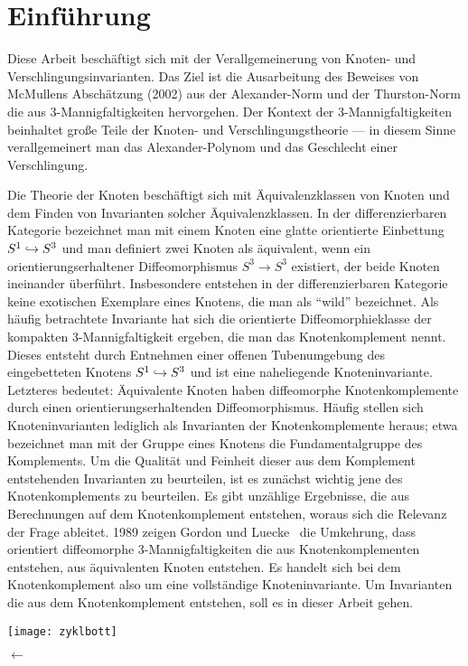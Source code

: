 \section{Einführung}
		
	\begin{minipage}[t][\textheight][t]{0.76\textwidth}

	Diese Arbeit beschäftigt sich mit der Verallgemeinerung von Knoten- und Verschlingungsinvarianten. Das Ziel ist die Ausarbeitung des Beweises von McMullens Abschätzung (2002) aus \cite{MCMULLEN.2002} der Alexander-Norm und der Thurston-Norm die aus 3-Mannigfaltigkeiten hervorgehen. Der Kontext der 3-Mannigfaltigkeiten beinhaltet große Teile der Knoten- und Verschlingungstheorie  --- in diesem Sinne verallgemeinert man das Alexander-Polynom und das Geschlecht einer Verschlingung.

	Die Theorie der Knoten beschäftigt sich mit Äquivalenzklassen von Knoten und dem Finden von Invarianten solcher Äquivalenzklassen. In der differenzierbaren Kategorie bezeichnet man mit einem Knoten eine glatte orientierte Einbettung $S^1\hookrightarrow S^3$ und man definiert zwei Knoten als äquivalent, wenn ein orientierungserhaltener Diffeomorphismus $S^3\to S^3$ existiert, der beide Knoten ineinander überführt. Insbesondere entstehen in der differenzierbaren Kategorie keine exotischen Exemplare eines Knotens, die man als "`wild"' bezeichnet. Als häufig betrachtete Invariante hat sich die orientierte Diffeomorphieklasse der kompakten 3-Mannigfaltigkeit ergeben, die man das Knotenkomplement nennt. Dieses entsteht durch Entnehmen einer offenen Tubenumgebung des eingebetteten Knotens $S^1 \hookrightarrow S^3$ und ist eine naheliegende Knoteninvariante. Letzteres bedeutet: Äquivalente Knoten haben diffeomorphe Knotenkomplemente durch einen orientierungserhaltenden Diffeomorphismus. Häufig stellen sich Knoteninvarianten lediglich als Invarianten der Knotenkomplemente heraus; etwa bezeichnet man mit der Gruppe eines Knotens die Fundamentalgruppe des Komplements. Um die Qualität und Feinheit dieser aus dem Komplement entstehenden Invarianten zu beurteilen, ist es zunächst wichtig jene des Knotenkomplements zu beurteilen. Es gibt unzählige Ergebnisse, die aus Berechnungen auf dem Knotenkomplement entstehen, woraus sich die Relevanz der Frage ableitet. 1989 zeigen Gordon und Luecke~\cite{Gordon.1989} die Umkehrung, dass orientiert diffeomorphe 3-Mannigfaltigkeiten die aus Knotenkomplementen entstehen, aus äquivalenten Knoten entstehen. Es handelt sich bei dem Knotenkomplement also um eine vollständige Knoteninvariante. Um Invarianten die aus dem Knotenkomplement entstehen, soll es in dieser Arbeit gehen.


	\vfill
	\begin{minipage}[t]{0.7\textwidth}
		\texttt{[image: zyklbott]} 
	\end{minipage}
	\begin{minipage}[t]{0.2\textwidth}
	\vspace{-1cm}
	\huge$\longleftarrow$
	\vfill

	\end{minipage}
	\vspace{.63cm}
		 \label{fig:zykl}
	\end{minipage}
